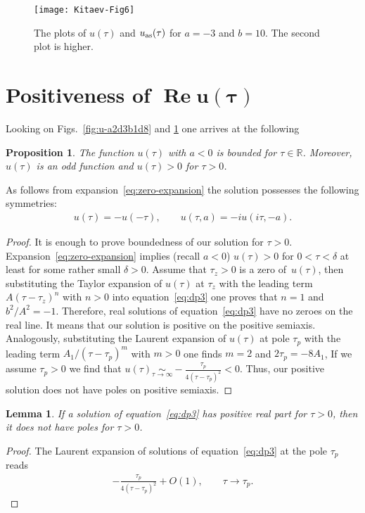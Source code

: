 \documentclass[pdftex]{sigma}
\numberwithin{equation}{section}
\newtheorem{Lemma}[Theorem]{Lemma}
\newtheorem{Proposition}[Theorem]{Proposition}
 { \theoremstyle{definition}
\newtheorem{Remark}[Theorem]{Remark} }
\begin{document}
\begin{figure}[h!]\centering
\texttt{[image: Kitaev-Fig6]}
\caption{The plots of $u(\tau)$ and $u_{\rm as}(\tau)$ for $a=-3$ and $b=10$. The second plot is higher.}\label{fig:u-a3b10}
\end{figure}

\section[Positiveness of $\operatorname{Re}u(\tau)$]{Positiveness of $\boldsymbol{\operatorname{Re}u(\tau)}$}\label{sec:positive}
Looking on Figs.~\ref{fig:u-a2d3b1d8} and \ref{fig:u-a3b10} one arrives at the following
\begin{Proposition}\label{prop:real-positive}
The function $u(\tau)$ with $a<0$ is bounded for $\tau\in\mathbb{R}$. Moreover, $u(\tau)$ is an odd
function and $u(\tau)>0$ for $\tau>0$.
\end{Proposition}
As follows from expansion~\eqref{eq:zero-expansion} the solution possesses the following symmetries:
\begin{gather}\label{eq:u-symmetries}
u(\tau)=-u(-\tau),\qquad u(\tau,a)=-iu(i\tau,-a).
\end{gather}
\begin{proof}
It is enough to prove boundedness of our solution for $\tau>0$. Expansion~\eqref{eq:zero-expansion} implies (recall $a<0$) $u(\tau)>0$ for $0<\tau<\delta$ at least for some
rather small $\delta>0$. Assume that $\tau_z>0$ is a zero of~$u(\tau)$, then substituting the Taylor expansion
of $u(\tau)$ at $\tau_z$ with the leading term $A(\tau-\tau_z)^n$ with \mbox{$n>0$} into equation~\eqref{eq:dp3} one
proves that $n=1$ and $b^2/A^2=-1$. Therefore, real solutions of equation~\eqref{eq:dp3} have no zeroes
on the real line. It means that our solution is positive on the positive semiaxis. Analogously, substituting
the Laurent expansion of $u(\tau)$ at pole $\tau_p$ with the leading term $A_1/(\tau-\tau_p)^m$ with $m>0$
one finds $m=2$ and $2\tau_p=-8A_1$, If we assume $\tau_p>0$ we find that
\mbox{$u(\tau)\underset{\tau\to\infty}{\sim}-\tfrac{\tau_p}{4(\tau-\tau_p)^2}<0$}. Thus, our positive solution
does not have poles on positive semiaxis.
\end{proof}

\begin{Lemma}If a solution of equation~\eqref{eq:dp3} has positive real part for $\tau>0$, then it does not have poles for $\tau>0$.
\end{Lemma}
\begin{proof}The Laurent expansion of solutions of equation~\eqref{eq:dp3} at the pole $\tau_p$ reads
\begin{gather*}
-\frac{\tau_p}{4(\tau-\tau_p)^2}+O(1),\qquad\tau\to\tau_p.\tag*{\qed}
\end{gather*}\renewcommand{\qed}{}
\end{proof}
\end{document}

